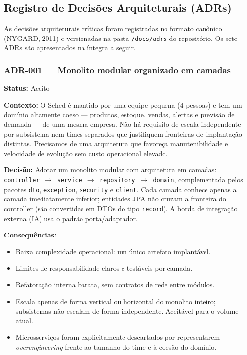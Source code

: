 \documentclass[12pt,a4paper]{article}
\begin{document}
\subsection{Registro de Decisões Arquiteturais (ADRs)}

As decisões arquiteturais críticas foram registradas no formato canônico (NYGARD, 2011) e versionadas na pasta \texttt{/docs/adrs} do repositório. Os sete ADRs são apresentados na íntegra a seguir.

\subsubsection{ADR-001 --- Monolito modular organizado em camadas}

\noindent\textbf{Status:} Aceito

\noindent\textbf{Contexto:}
O Sched é mantido por uma equipe pequena (4 pessoas) e tem um domínio altamente coeso — produtos, estoque, vendas, alertas e previsão de demanda — de uma mesma empresa. Não há requisito de escala independente por subsistema nem times separados que justifiquem fronteiras de implantação distintas. Precisamos de uma arquitetura que favoreça manutenibilidade e velocidade de evolução sem custo operacional elevado.

\noindent\textbf{Decisão:}
Adotar um monolito modular com arquitetura em camadas: \texttt{controller~$\rightarrow$~service~$\rightarrow$~repository~$\rightarrow$~domain}, complementada pelos pacotes \texttt{dto}, \texttt{exception}, \texttt{security} e \texttt{client}. Cada camada conhece apenas a camada imediatamente inferior; entidades JPA não cruzam a fronteira do controller (são convertidas em DTOs do tipo \texttt{record}). A borda de integração externa (IA) usa o padrão porta/adaptador.

\noindent\textbf{Consequências:}
\begin{itemize}
    \item[+] Baixa complexidade operacional: um único artefato implantável.
    \item[+] Limites de responsabilidade claros e testáveis por camada.
    \item[+] Refatoração interna barata, sem contratos de rede entre módulos.
    \item[--] Escala apenas de forma vertical ou horizontal do monolito inteiro; subsistemas não escalam de forma independente. Aceitável para o volume atual.
    \item[--] Microsserviços foram explicitamente descartados por representarem \textit{overengineering} frente ao tamanho do time e à coesão do domínio.
\end{itemize}
\end{document}
